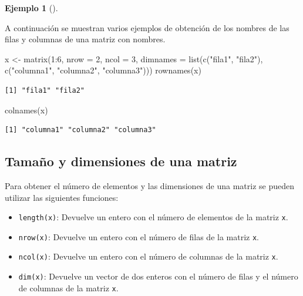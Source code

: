\documentclass[
  a4paper,
]{scrreport}
\newenvironment{Shaded}{\begin{snugshade}}{\end{snugshade}}
\newcommand{\AttributeTok}[1]{\textcolor[rgb]{0.40,0.45,0.13}{#1}}
\newcommand{\DecValTok}[1]{\textcolor[rgb]{0.68,0.00,0.00}{#1}}
\newcommand{\FunctionTok}[1]{\textcolor[rgb]{0.28,0.35,0.67}{#1}}
\newcommand{\NormalTok}[1]{\textcolor[rgb]{0.00,0.23,0.31}{#1}}
\newcommand{\OtherTok}[1]{\textcolor[rgb]{0.00,0.23,0.31}{#1}}
\newcommand{\SpecialCharTok}[1]{\textcolor[rgb]{0.37,0.37,0.37}{#1}}
\newcommand{\StringTok}[1]{\textcolor[rgb]{0.13,0.47,0.30}{#1}}
\providecommand{\tightlist}{%
  \setlength{\itemsep}{0pt}\setlength{\parskip}{0pt}}\usepackage{longtable,booktabs,array}
\theoremstyle{definition}
\newtheorem{example}{Ejemplo}[chapter]
\theoremstyle{definition}
\theoremstyle{remark}
\begin{document}
\leavevmode{}%
\begin{example}[]\label{exm-obtencion-nombres-matriz}

A continuación se muestran varios ejemplos de obtención de los nombres
de las filas y columnas de una matriz con nombres.

\begin{Shaded}
\begin{Highlighting}[]
\NormalTok{x }\OtherTok{\textless{}{-}} \FunctionTok{matrix}\NormalTok{(}\DecValTok{1}\SpecialCharTok{:}\DecValTok{6}\NormalTok{, }\AttributeTok{nrow =} \DecValTok{2}\NormalTok{, }\AttributeTok{ncol =} \DecValTok{3}\NormalTok{, }\AttributeTok{dimnames =} \FunctionTok{list}\NormalTok{(}\FunctionTok{c}\NormalTok{(}\StringTok{"fila1"}\NormalTok{, }\StringTok{"fila2"}\NormalTok{), }\FunctionTok{c}\NormalTok{(}\StringTok{"columna1"}\NormalTok{, }\StringTok{"columna2"}\NormalTok{, }\StringTok{"columna3"}\NormalTok{)))}
\FunctionTok{rownames}\NormalTok{(x)}
\end{Highlighting}
\end{Shaded}

\begin{verbatim}
[1] "fila1" "fila2"
\end{verbatim}

\begin{Shaded}
\begin{Highlighting}[]
\FunctionTok{colnames}\NormalTok{(x)}
\end{Highlighting}
\end{Shaded}

\begin{verbatim}
[1] "columna1" "columna2" "columna3"
\end{verbatim}

\end{example}

\hypertarget{tamauxf1o-y-dimensiones-de-una-matriz}{%
\subsection{Tamaño y dimensiones de una
matriz}\label{tamauxf1o-y-dimensiones-de-una-matriz}}

Para obtener el número de elementos y las dimensiones de una matriz se
pueden utilizar las siguientes funciones:

\begin{itemize}
\tightlist
\item
  \texttt{length(x)}: Devuelve un entero con el número de elementos de
  la matriz \texttt{x}.
\item
  \texttt{nrow(x)}: Devuelve un entero con el número de filas de la
  matriz \texttt{x}.
\item
  \texttt{ncol(x)}: Devuelve un entero con el número de columnas de la
  matriz \texttt{x}.
\item
  \texttt{dim(x)}: Devuelve un vector de dos enteros con el número de
  filas y el número de columnas de la matriz \texttt{x}.
\end{itemize}
\end{document}
